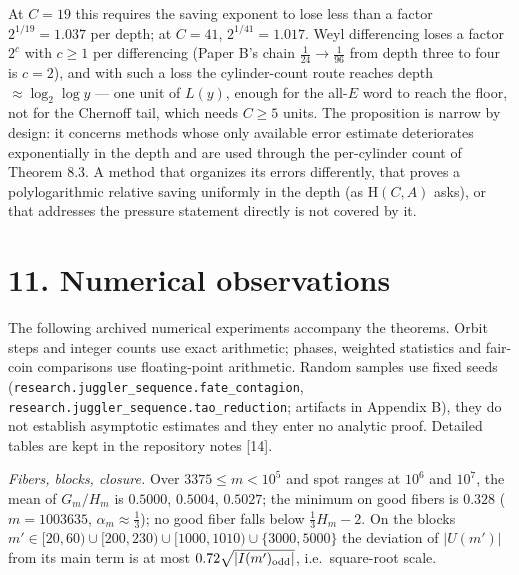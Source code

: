 \documentclass[11pt,a4paper]{article}
\begin{document}
At \(C=19\) this requires the saving exponent to lose less than a factor
\(2^{1/19}=1.037\) per depth; at \(C=41\), \(2^{1/41}=1.017\). Weyl
differencing loses a factor \(2^{c}\) with \(c\ge1\) per differencing
(Paper B's chain \(\tfrac1{24}\to\tfrac1{96}\) from depth three to four
is \(c=2\)), and with such a loss the cylinder-count route reaches depth
\(\approx\log_2\log y\) --- one unit of \(L(y)\), enough for the
all-\(E\) word to reach the floor, not for the Chernoff tail, which
needs \(C\ge 5\) units. The proposition is narrow by design: it concerns
methods whose only available error estimate deteriorates exponentially
in the depth and are used through the per-cylinder count of Theorem 8.3.
A method that organizes its errors differently, that proves a
polylogarithmic relative saving uniformly in the depth (as
\(\mathrm H(C,A)\) asks), or that addresses the pressure statement
directly is not covered by it.

\section{11. Numerical observations}\label{numerical-observations}

The following archived numerical experiments accompany the theorems.
Orbit steps and integer counts use exact arithmetic; phases, weighted
statistics and fair-coin comparisons use floating-point arithmetic.
Random samples use fixed seeds
(\texttt{\nolinkurl{research.juggler_sequence.fate_contagion}},
\texttt{\nolinkurl{research.juggler_sequence.tao_reduction}}; artifacts
in Appendix B), they do not establish asymptotic estimates and they
enter no analytic proof. Detailed tables are kept in the repository
notes {[}14{]}.

\emph{Fibers, blocks, closure.} Over \(3375\le m<10^5\) and spot ranges
at \(10^6\) and \(10^7\), the mean of \(G_m/H_m\) is \(0.5000\),
\(0.5004\), \(0.5027\); the minimum on good fibers is \(0.328\)
(\(m=1003635\), \(\alpha_m\approx\tfrac13\)); no good fiber falls below
\(\tfrac13H_m-2\). On the blocks
\(m'\in[20,60)\cup[200,230)\cup[1000,1010)\cup\{3000,5000\}\) the
deviation of \(|U(m')|\) from its main term is at most
\(0.72\sqrt{|I(m')_{\rm odd}|}\), i.e.~square-root scale.
\end{document}
